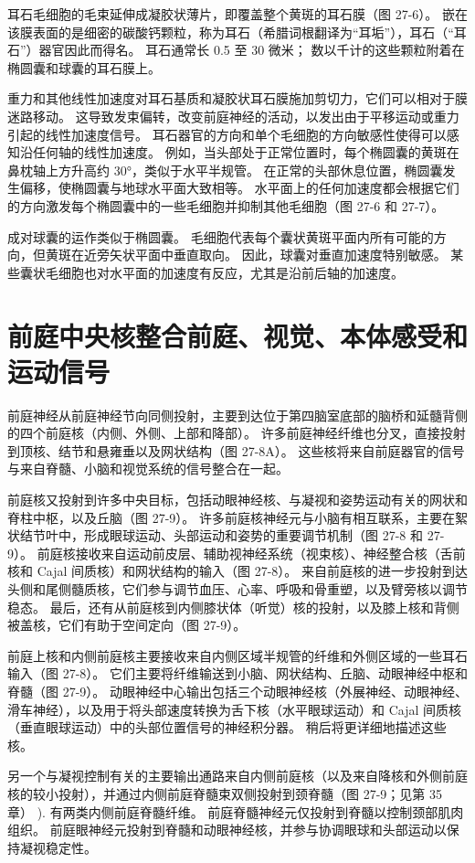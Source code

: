耳石毛细胞的毛束延伸成凝胶状薄片，即覆盖整个黄斑的耳石膜（图 27-6）。 嵌在该膜表面的是细密的碳酸钙颗粒，称为耳石（希腊词根翻译为“耳垢”），耳石（“耳石”）器官因此而得名。 耳石通常长 0.5 至 30 微米； 数以千计的这些颗粒附着在椭圆囊和球囊的耳石膜上。

重力和其他线性加速度对耳石基质和凝胶状耳石膜施加剪切力，它们可以相对于膜迷路移动。 这导致发束偏转，改变前庭神经的活动，以发出由于平移运动或重力引起的线性加速度信号。 耳石器官的方向和单个毛细胞的方向敏感性使得可以感知沿任何轴的线性加速度。 例如，当头部处于正常位置时，每个椭圆囊的黄斑在鼻枕轴上方升高约 30°，类似于水平半规管。 在正常的头部休息位置，椭圆囊发生偏移，使椭圆囊与地球水平面大致相等。 水平面上的任何加速度都会根据它们的方向激发每个椭圆囊中的一些毛细胞并抑制其他毛细胞（图 27-6 和 27-7）。

成对球囊的运作类似于椭圆囊。 毛细胞代表每个囊状黄斑平面内所有可能的方向，但黄斑在近旁矢状平面中垂直取向。 因此，球囊对垂直加速度特别敏感。 某些囊状毛细胞也对水平面的加速度有反应，尤其是沿前后轴的加速度。


\section{前庭中央核整合前庭、视觉、本体感受和运动信号}
前庭神经从前庭神经节向同侧投射，主要到达位于第四脑室底部的脑桥和延髓背侧的四个前庭核（内侧、外侧、上部和降部）。 许多前庭神经纤维也分叉，直接投射到顶核、结节和悬雍垂以及网状结构（图 27-8A）。 这些核将来自前庭器官的信号与来自脊髓、小脑和视觉系统的信号整合在一起。

前庭核又投射到许多中央目标，包括动眼神经核、与凝视和姿势运动有关的网状和脊柱中枢，以及丘脑（图 27-9）。 许多前庭核神经元与小脑有相互联系，主要在絮状结节叶中，形成眼球运动、头部运动和姿势的重要调节机制（图 27-8 和 27-9）。 前庭核接收来自运动前皮层、辅助视神经系统（视束核）、神经整合核（舌前核和 Cajal 间质核）和网状结构的输入（图 27-8）。 来自前庭核的进一步投射到达头侧和尾侧髓质核，它们参与调节血压、心率、呼吸和骨重塑，以及臂旁核以调节稳态。 最后，还有从前庭核到内侧膝状体（听觉）核的投射，以及膝上核和背侧被盖核，它们有助于空间定向（图 27-9）。

前庭上核和内侧前庭核主要接收来自内侧区域半规管的纤维和外侧区域的一些耳石输入（图 27-8）。 它们主要将纤维输送到小脑、网状结构、丘脑、动眼神经中枢和脊髓（图 27-9）。 动眼神经中心输出包括三个动眼神经核（外展神经、动眼神经、滑车神经），以及用于将头部速度转换为舌下核（水平眼球运动）和 Cajal 间质核（垂直眼球运动）中的头部位置信号的神经积分器。 稍后将更详细地描述这些核。

另一个与凝视控制有关的主要输出通路来自内侧前庭核（以及来自降核和外侧前庭核的较小投射），并通过内侧前庭脊髓束双侧投射到颈脊髓（图 27-9；见第 35 章） ). 有两类内侧前庭脊髓纤维。 前庭脊髓神经元仅投射到脊髓以控制颈部肌肉组织。 前庭眼神经元投射到脊髓和动眼神经核，并参与协调眼球和头部运动以保持凝视稳定性。

